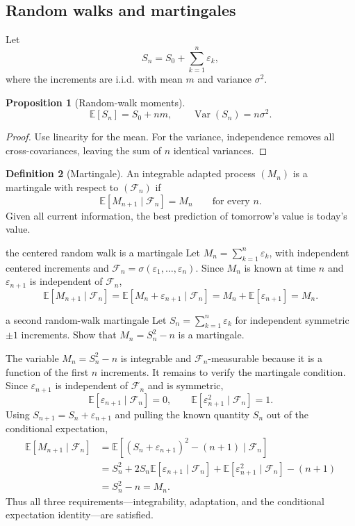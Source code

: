 \documentclass[10pt]{article}
\newcommand{\E}{\mathbb E}
\newcommand{\Var}{\operatorname{Var}}
\newcommand{\1}{\mathbf 1}
\newcommand{\cF}{\mathcal F}
\theoremstyle{definition}
\newtheorem{definition}{Definition}[section]
\newtheorem{proposition}[definition]{Proposition}
\begin{document}
\subsection{Random walks and martingales}

Let
\[
S_n=S_0+\sum_{k=1}^n\varepsilon_k,
\]
where the increments are i.i.d. with mean $m$ and variance $\sigma^2$.

\begin{proposition}[Random-walk moments]
\[
\E[S_n]=S_0+nm,
\qquad
\Var(S_n)=n\sigma^2.
\]
\end{proposition}
\begin{proof}
Use linearity for the mean. For the variance, independence removes all
cross-covariances, leaving the sum of $n$ identical variances.
\end{proof}

\begin{definition}[Martingale]
An integrable adapted process $(M_n)$ is a martingale with respect to
$(\cF_n)$ if
\[
\E[M_{n+1}\mid\cF_n]=M_n
\qquad\text{for every }n.
\]
Given all current information, the best prediction of tomorrow's value is
today's value.
\end{definition}

\begin{boardexample}{the centered random walk is a martingale}
Let $M_n=\sum_{k=1}^n\varepsilon_k$, with independent centered increments and
$\cF_n=\sigma(\varepsilon_1,\ldots,\varepsilon_n)$. Since $M_n$ is known at
time $n$ and $\varepsilon_{n+1}$ is independent of $\cF_n$,
\[
\E[M_{n+1}\mid\cF_n]
=\E[M_n+\varepsilon_{n+1}\mid\cF_n]
=M_n+\E[\varepsilon_{n+1}]
=M_n.
\]
\end{boardexample}

\begin{studentexercise}{a second random-walk martingale}
Let $S_n=\sum_{k=1}^n\varepsilon_k$ for independent symmetric $\pm1$
increments. Show that $M_n=S_n^2-n$ is a martingale.
\end{studentexercise}
\begin{shortsolution}
The variable $M_n=S_n^2-n$ is integrable and $\cF_n$-measurable because it is
a function of the first $n$ increments. It remains to verify the martingale
condition. Since $\varepsilon_{n+1}$ is independent of $\cF_n$ and is
symmetric,
\[
\E[\varepsilon_{n+1}\mid\cF_n]=0,
\qquad
\E[\varepsilon_{n+1}^2\mid\cF_n]=1.
\]
Using $S_{n+1}=S_n+\varepsilon_{n+1}$ and pulling the known quantity $S_n$
out of the conditional expectation,
\begin{align*}
\E[M_{n+1}\mid\cF_n]
&=\E[(S_n+\varepsilon_{n+1})^2-(n+1)\mid\cF_n]\\
&=S_n^2+2S_n\E[\varepsilon_{n+1}\mid\cF_n]
  +\E[\varepsilon_{n+1}^2\mid\cF_n]-(n+1)\\
&=S_n^2-n=M_n.
\end{align*}
Thus all three requirements---integrability, adaptation, and the conditional
expectation identity---are satisfied.
\end{shortsolution}
\end{document}
